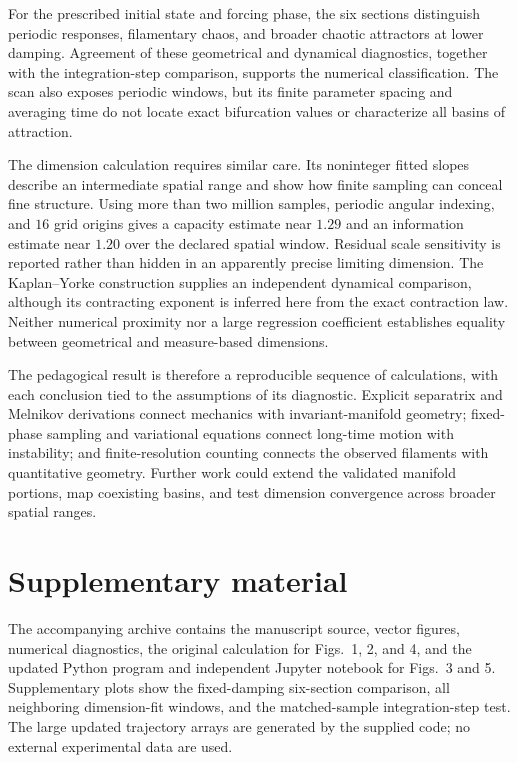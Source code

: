 \documentclass[aps,prb,reprint,floatfix]{revtex4-2}
\begin{document}
For the prescribed initial state and forcing phase, the six sections distinguish periodic responses, filamentary chaos, and broader chaotic attractors at lower damping. Agreement of these geometrical and dynamical diagnostics, together with the integration-step comparison, supports the numerical classification. The scan also exposes periodic windows, but its finite parameter spacing and averaging time do not locate exact bifurcation values or characterize all basins of attraction.

The dimension calculation requires similar care. Its noninteger fitted slopes describe an intermediate spatial range and show how finite sampling can conceal fine structure. Using more than two million samples, periodic angular indexing, and $16$ grid origins gives a capacity estimate near $1.29$ and an information estimate near $1.20$ over the declared spatial window. Residual scale sensitivity is reported rather than hidden in an apparently precise limiting dimension. The Kaplan--Yorke construction supplies an independent dynamical comparison, although its contracting exponent is inferred here from the exact contraction law. Neither numerical proximity nor a large regression coefficient establishes equality between geometrical and measure-based dimensions.

The pedagogical result is therefore a reproducible sequence of calculations, with each conclusion tied to the assumptions of its diagnostic. Explicit separatrix and Melnikov derivations connect mechanics with invariant-manifold geometry; fixed-phase sampling and variational equations connect long-time motion with instability; and finite-resolution counting connects the observed filaments with quantitative geometry. Further work could extend the validated manifold portions, map coexisting basins, and test dimension convergence across broader spatial ranges.

\section*{Supplementary material}
The accompanying archive contains the manuscript source, vector figures, numerical diagnostics, the original calculation for Figs.~1, 2, and 4, and the updated Python program and independent Jupyter notebook for Figs.~3 and 5. Supplementary plots show the fixed-damping six-section comparison, all neighboring dimension-fit windows, and the matched-sample integration-step test. The large updated trajectory arrays are generated by the supplied code; no external experimental data are used.
\end{document}
